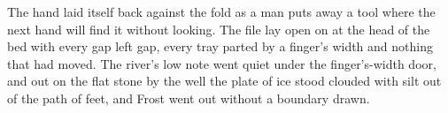 The hand laid itself back against the fold as a man puts away a tool where the next hand will find it without looking. The file lay open on  at the head of the bed with every gap left gap, every tray parted by a finger's width and nothing that had moved. The river's low note went quiet under the finger's-width door, and out on the flat stone by the well the plate of ice stood clouded with silt out of the path of feet, and Frost went out without a boundary drawn.
